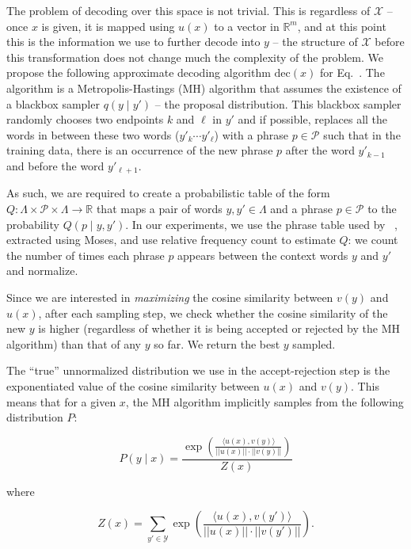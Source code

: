\documentclass[letterpaper]{article}
\newcommand{\inx}{\mathcal{X}}
\newcommand{\outy}{\mathcal{Y}}
\newcommand{\phrasetable}{\mathcal{P}}
\newcommand{\decoder}{\mathrm{dec}}
\newcommand{\newcite}[1]{\citeauthor{#1}~\shortcite{#1}}
\begin{document}
The problem of decoding over this space is not trivial. This is regardless of $\inx$ -- once $x$ is given, it is mapped
using $u(x)$ to a vector in $\mathbb{R}^m$, and at this point this is the information we use to further decode into $y$ -- 
the structure of $\inx$ before this transformation does not change much the complexity of the problem.
We propose the following approximate decoding algorithm $\decoder(x)$ for Eq.~. The algorithm is a Metropolis-Hastings (MH) algorithm that assumes
the existence of a blackbox sampler $q(y \mid y')$ -- the proposal distribution. This blackbox sampler randomly chooses two endpoints $k$ and $\ell$ in $y'$ and if possible,
replaces all the words in between these two words ($y'_k \cdots y'_{\ell}$) with a phrase $p \in \phrasetable$ such that in the training data, there is an occurrence of the new phrase
$p$ after the word $y'_{k-1}$ and before the word $y'_{\ell+1}$.

As such, we are required to create a probabilistic table of the form $Q \colon \Lambda \times \phrasetable \times \Lambda \rightarrow \mathbb{R}$ that
maps a pair of words $y,y' \in \Lambda$ and a phrase $p \in \phrasetable$ to the probability $Q(p \mid y,y')$. In our experiments, we use the phrase
table used by \newcite{ortiz2015learning}, extracted using Moses, and use relative frequency count to estimate $Q$: we count the number of times each
phrase $p$ appears between the context words $y$ and $y'$ and normalize.						

Since we are interested in {\em maximizing} the cosine similarity between $v(y)$ and $u(x)$, after each sampling step, we check whether
the cosine similarity of the new $y$ is higher (regardless of whether it is being accepted or rejected by the MH algorithm) than that of any $y$ so far.
We return the best $y$ sampled.

The ``true'' unnormalized distribution we use in the accept-rejection step is the exponentiated value of the cosine similarity between $u(x)$ and $v(y)$.
This means that for a given $x$, the MH algorithm implicitly samples from the following distribution $P$:

\begin{equation}
P(y \mid x) = \frac{\exp\left(\displaystyle\frac{\langle u(x), v(y) \rangle}{||u(x)|| \cdot || v(y)||}\right)}{Z(x)} \label{eq:a}
\end{equation}

\noindent where

\begin{equation}
Z(x) = \sum_{y' \in \outy} \exp\left(\displaystyle\frac{\langle u(x), v(y') \rangle}{||u(x)|| \cdot || v(y')||}\right).
\end{equation}
\end{document}

